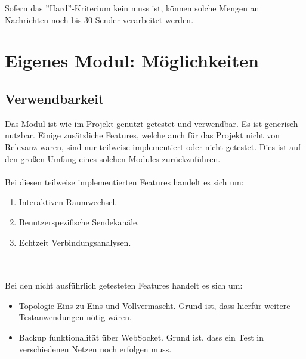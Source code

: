 Sofern das ''Hard''-Kriterium kein muss ist, können solche Mengen an Nachrichten noch bis 30 Sender verarbeitet werden.



\section{Eigenes Modul: Möglichkeiten}

\subsection{Verwendbarkeit}
Das Modul ist wie im Projekt genutzt getestet und verwendbar. 
Es ist generisch nutzbar.
Einige zusätzliche Features, welche auch für das Projekt nicht von Relevanz waren, sind nur teilweise implementiert oder nicht getestet. 
Dies ist auf den großen Umfang eines solchen Modules zurückzuführen. \\ \\
Bei diesen teilweise implementierten Features handelt es sich um:
\begin{enumerate}
\item
Interaktiven Raumwechsel.

\item
Benutzerspezifische Sendekanäle.

\item
Echtzeit Verbindungsanalysen.
\end{enumerate}
\\ \\
Bei den nicht ausführlich getesteten Features handelt es sich um:
\begin{itemize}
\item
Topologie Eins-zu-Eins und Vollvermascht. Grund ist, dass hierfür weitere Testanwendungen nötig wären.

\item
Backup funktionalität über WebSocket. Grund ist, dass ein Test in verschiedenen Netzen noch erfolgen muss.
\end{itemize}


